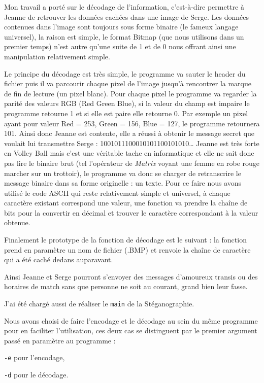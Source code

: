 \documentclass[a4paper,12pt]{article}
\begin{document}
Mon travail a porté sur le décodage de l'information, c'est-à-dire permettre à Jeanne de retrouver les données cachées dans une image de Serge. Les données contenues dans l'image sont toujours sous forme binaire (le fameux langage universel), la raison est simple, le format Bitmap (que nous utilisons dans un premier temps) n'est autre qu'une suite de 1 et de 0 nous offrant ainsi une manipulation relativement simple.

Le principe du décodage est très simple, le programme va sauter le header du fichier puis il va parcourir chaque pixel de l'image jusqu'à rencontrer la marque de fin de lecture (un pixel blanc). Pour chaque pixel le programme va regarder la parité des valeurs RGB (Red Green Blue), si la valeur du champ est impaire le programme retourne 1 et si elle est paire elle retourne 0. Par exemple un pixel ayant pour valeur Red = 253, Green = 156, Blue = 127, le programme retournera 101. Ainsi donc Jeanne est contente, elle a réussi à obtenir le message secret que voulait lui transmettre Serge : 1001011100010101100101010\dots{} Jeanne est très forte en Volley Ball mais c'est une véritable tache en informatique et elle ne sait donc pas lire le binaire brut (tel l'opérateur de \emph{Matrix} voyant une femme en robe rouge marcher sur un trottoir), le programme va donc se charger de retranscrire le message binaire dans sa forme originelle : un texte. Pour ce faire nous avons utilisé le code ASCII qui reste relativement simple et universel, à chaque caractère existant correspond une valeur, une fonction va prendre la chaîne de bits pour la convertir en décimal et trouver le caractère correspondant à la valeur obtenue.

Finalement le prototype de la fonction de décodage est le suivant : la fonction prend en paramètre un nom de fichier (.BMP) et renvoie la chaîne de caractère qui a été caché dedans auparavant.

Ainsi Jeanne et Serge pourront s'envoyer des messages d'amoureux transis ou des horaires de match sans que personne ne soit au courant, grand bien leur fasse.

J'ai été chargé aussi de réaliser le \texttt{main} de la Stéganographie.

Nous avons choisi de faire l'encodage et le décodage au sein du même programme pour en faciliter l'utilisation, ces deux cas se distinguent par le premier argument passé en paramètre au programme :

\texttt{-e} pour l'encodage,

\texttt{-d} pour le décodage.
\end{document}

